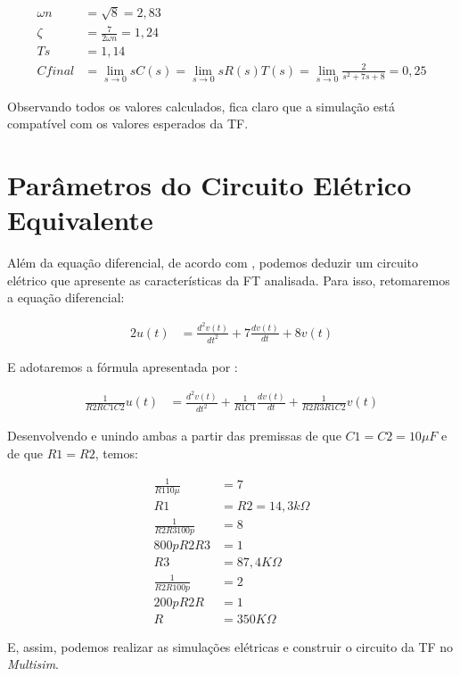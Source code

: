 \documentclass[
	article,			%
	11pt,				%
	oneside,			%
	a4paper,			%
	english,			%
	brazil,				%
	sumario=tradicional
	]{abntex2}
\begin{document}
\begin{align*}
  \omega n &= \sqrt{8} = 2,83 \\
  \zeta &= \frac{7}{2\omega n} = 1,24 \\
  Ts &= 1,14 \\
  Cfinal &= \lim_{s\to 0} sC(s) = \lim_{s\to 0} sR(s)T(s) = \lim_{s\to 0} \frac{2}{s^2 + 7s + 8} = 0,25
\end{align*}

Observando todos os valores calculados, fica claro que a simulação está compatível com os valores esperados da TF.

\section{Parâmetros do Circuito Elétrico Equivalente}

Além da equação diferencial, de acordo com \cite{controleessencial}, podemos deduzir um circuito elétrico que
apresente as características da FT analisada. Para isso, retomaremos a equação diferencial:

\begin{align*}
  2u(t) &= \frac{d^2 v(t)}{dt^2} + 7\frac{d v(t)}{dt} + 8v(t)
\end{align*}

E adotaremos a fórmula apresentada por \cite{controleessencial}:

\begin{align*}
  \frac{1}{R2RC1C2}u(t) &= \frac{d^2 v(t)}{dt^2} + \frac{1}{R1C1}\frac{d v(t)}{dt} + \frac{1}{R2R3R1C2}v(t)
\end{align*}

Desenvolvendo e unindo ambas a partir das premissas de que ${C1 = C2 = 10 \mu F}$ e de que ${R1 = R2}$, temos:

\begin{align*}
  \frac{1}{R1 10\mu} &= 7 \\
  R1 &= R2 = 14,3k\Omega \\
  \frac{1}{R2R3 100p} &= 8 \\
  800p R2R3 &= 1 \\
  R3 &= 87,4K\Omega \\
  \frac{1}{R2R 100p} &= 2 \\
  200p R2R &= 1 \\
  R &= 350K\Omega
\end{align*}

E, assim, podemos realizar as simulações elétricas e construir o circuito da TF no \emph{Multisim}.
\end{document}
